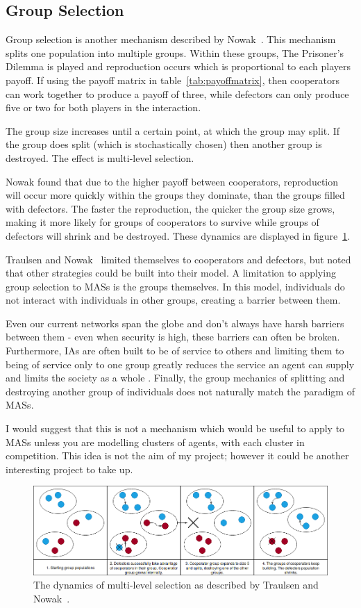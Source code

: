 \documentclass[]{final_report}
\begin{document}
\subsection{Group Selection}
\label{appendix:groupselection}
Group selection is another mechanism described by Nowak~\cite{five_rules_coop}. This mechanism splits one population into multiple groups. Within these groups, The Prisoner's Dilemma is played and reproduction occurs which is proportional to each players payoff. If using the payoff matrix in table~\ref{tab:payoffmatrix}, then cooperators can work together to produce a payoff of three, while defectors can only produce five or two for both players in the interaction.\par
The group size increases until a certain point, at which the group may split. If the group does split (which is stochastically chosen) then another group is destroyed. The effect is multi-level selection.\par
Nowak found that due to the higher payoff between cooperators, reproduction will occur more quickly within the groups they dominate, than the groups filled with defectors. The faster the reproduction, the quicker the group size grows, making it more likely for groups of cooperators to survive while groups of defectors will shrink and be destroyed. These dynamics are displayed in figure~\ref{fig:group}.\par
Traulsen and Nowak~\cite{multilevel_nowak} limited themselves to cooperators and defectors, but noted that other strategies could be built into their model. A limitation to applying group selection to MASs is the groups themselves. In this model, individuals do not interact with individuals in other groups, creating a barrier between them.\par
Even our current networks span the globe and don't always have harsh barriers between them - even when security is high, these barriers can often be broken. Furthermore, IAs are often built to be of service to others and limiting them to being of service only to one group greatly reduces the service an agent can supply and limits the society as a whole . Finally, the group mechanics of splitting and destroying another group of individuals does not naturally match the paradigm of MASs.\par
I would suggest that this is not a mechanism which would be useful to apply to MASs unless you are modelling clusters of agents, with each cluster in competition. This idea is not the aim of my project; however it could be another interesting project to take up.
\begin{figure}
	\center
	\includegraphics[width=\textwidth]{GroupSelection.png}
	\caption{The dynamics of multi-level selection as described by Traulsen and Nowak~\cite{multilevel_nowak}.}
	\label{fig:group}
\end{figure}
\end{document}

